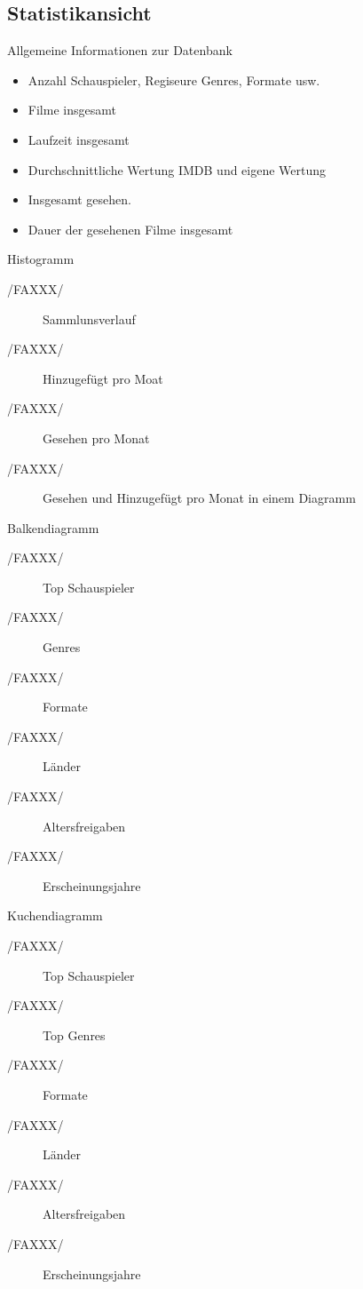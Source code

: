 \newpage
\subsection{Statistikansicht}
\begin{description}
	\item Allgemeine Informationen zur Datenbank
	\begin{itemize}
		\item Anzahl Schauspieler, Regiseure Genres, Formate usw.
		\item Filme insgesamt
		\item Laufzeit insgesamt
		\item Durchschnittliche Wertung IMDB und eigene Wertung
		\item Insgesamt gesehen.
		\item Dauer der gesehenen Filme insgesamt
	\end{itemize}
	\item[/FAXXX/] Histogramm
	\begin{description}
		\item[/FAXXX/] Sammlunsverlauf
		\item[/FAXXX/] Hinzugefügt pro Moat
		\item[/FAXXX/] Gesehen pro Monat
		\item[/FAXXX/] Gesehen und Hinzugefügt pro Monat in einem Diagramm			
	\end{description}
	\item[/FAXXX/] Balkendiagramm
	\begin{description}
		\item[/FAXXX/] Top Schauspieler
		\item[/FAXXX/] Genres
		\item[/FAXXX/] Formate
		\item[/FAXXX/] Länder
		\item[/FAXXX/] Altersfreigaben
		\item[/FAXXX/] Erscheinungsjahre
	\end{description}
	\item[/FAXXX/] Kuchendiagramm
	\begin{description}
		\item[/FAXXX/] Top Schauspieler			
		\item[/FAXXX/] Top Genres
		\item[/FAXXX/] Formate
		\item[/FAXXX/] Länder
		\item[/FAXXX/] Altersfreigaben
		\item[/FAXXX/] Erscheinungsjahre
	\end{description}
\end{description}




